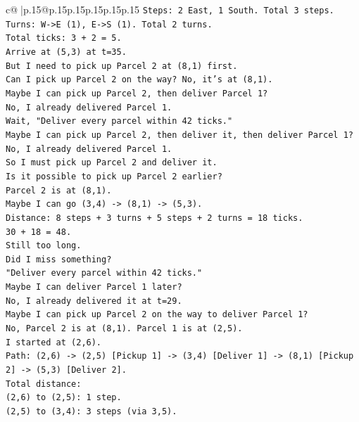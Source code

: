 \documentclass{article}
\begin{document}
{\begin{supertabular}{c@{$\;$}|p{.15\linewidth}@{}p{.15\linewidth}p{.15\linewidth}p{.15\linewidth}p{.15\linewidth}p{.15\linewidth}}
{{{\texttt{Steps: 2 East, 1 South. Total 3 steps.} \\
\texttt{Turns: W{-}>E (1), E{-}>S (1). Total 2 turns.} \\
\texttt{Total ticks: 3 + 2 = 5.} \\
\texttt{Arrive at (5,3) at t=35.} \\
\texttt{But I need to pick up Parcel 2 at (8,1) first.} \\
\texttt{Can I pick up Parcel 2 on the way? No, it's at (8,1).} \\
\texttt{Maybe I can pick up Parcel 2, then deliver Parcel 1?} \\
\texttt{No, I already delivered Parcel 1.} \\
\texttt{Wait, "Deliver every parcel within 42 ticks."} \\
\texttt{Maybe I can pick up Parcel 2, then deliver it, then deliver Parcel 1?} \\
\texttt{No, I already delivered Parcel 1.} \\
\texttt{So I must pick up Parcel 2 and deliver it.} \\
\texttt{Is it possible to pick up Parcel 2 earlier?} \\
\texttt{Parcel 2 is at (8,1).} \\
\texttt{Maybe I can go (3,4) {-}> (8,1) {-}> (5,3).} \\
\texttt{Distance: 8 steps + 3 turns + 5 steps + 2 turns = 18 ticks.} \\
\texttt{30 + 18 = 48.} \\
\texttt{Still too long.} \\
\texttt{Did I miss something?} \\
\texttt{"Deliver every parcel within 42 ticks."} \\
\texttt{Maybe I can deliver Parcel 1 later?} \\
\texttt{No, I already delivered it at t=29.} \\
\texttt{Maybe I can pick up Parcel 2 on the way to deliver Parcel 1?} \\
\texttt{No, Parcel 2 is at (8,1). Parcel 1 is at (2,5).} \\
\texttt{I started at (2,6).} \\
\texttt{Path: (2,6) {-}> (2,5) {[}Pickup 1{]} {-}> (3,4) {[}Deliver 1{]} {-}> (8,1) {[}Pickup 2{]} {-}> (5,3) {[}Deliver 2{]}.} \\
\texttt{Total distance:} \\
\texttt{(2,6) to (2,5): 1 step.} \\
\texttt{(2,5) to (3,4): 3 steps (via 3,5).} \\
}}}
\end{supertabular}}
\end{document}
